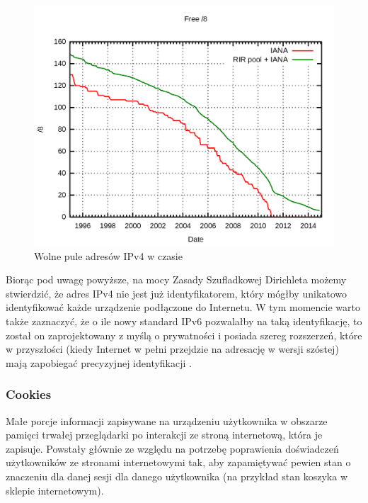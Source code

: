 \begin{figure}
	\includegraphics[width=\textwidth,keepaspectratio]{img/01}
	\caption{Wolne pule adresów IPv4 w czasie}
\end{figure}

Biorąc pod uwagę powyższe, na mocy Zasady Szufladkowej Dirichleta możemy
stwierdzić, że adres IPv4 nie jest już identyfikatorem, który mógłby unikatowo
identyfikować każde urządzenie podłączone do Internetu. W tym momencie warto
także zaznaczyć, że o ile nowy standard IPv6 pozwalałby na taką identyfikację,
to został on zaprojektowany z myślą o prywatności i posiada szereg rozszerzeń,
które w przyszłości (kiedy Internet w pełni przejdzie na adresację w wersji
szóstej) mają zapobiegać precyzyjnej identyfikacji \cite{narten2001privacy}.

\subsubsection{Cookies}
Małe porcje informacji zapisywane na urządzeniu użytkownika w obszarze pamięci
trwałej przeglądarki po interakcji ze stroną internetową, która je zapisuje.
Powstały głównie ze względu na potrzebę poprawienia doświadczeń użytkowników ze
stronami internetowymi tak, aby zapamiętywać pewien stan o znaczeniu dla danej
sesji dla danego użytkownika (na przykład stan koszyka w sklepie internetowym).

